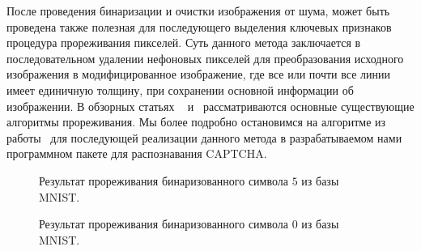 \documentclass[a4paper,12pt,russian]{article} %
\begin{document}
После проведения бинаризации и очистки изображения от шума, может быть проведена также полезная для последующего выделения ключевых признаков процедура прореживания пикселей.
Суть данного метода заключается в последовательном удалении нефоновых пикселей для преобразования исходного изображения в модифицированное изображение, где все или почти все линии имеет единичную толщину, при сохранении основной информации об изображении.
В обзорных статьях ~\cite{lam1992thinning} и~\cite{gramblivcka2016comparison} рассматриваются основные существующие алгоритмы прореживания.
Мы более подробно остановимся на алгоритме из работы~\cite{zhang1984fast} для последующей реализации данного метода в разрабатываемом нами программном пакете для распознавания CAPTCHA.

\begin{figure}[t!]
	\caption{
		Результат прореживания бинаризованного символа $5$ из базы MNIST.
        }
        \label{fig:nn_skelets_ex0}
\end{figure}
  
\begin{figure}[t!]
	\caption{
		Результат прореживания бинаризованного символа $0$ из базы MNIST.
        }
        \label{fig:nn_skelets_ex1}
\end{figure}
\end{document}
